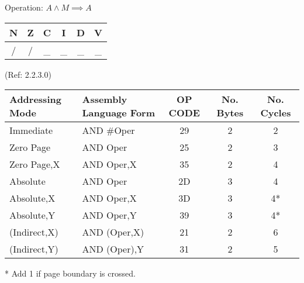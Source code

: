 \documentclass{article}
\begin{document}
  Operation:  
  $A \land M \implies A$
  \begin{table}[H]
  \centering
  \begin{tabular}{|c c c c c c|}
  \hline
  N&Z&C&I&D&V\\
  \hline
  /&/&\_&\_&\_&\_\\
  \hline
  \end{tabular}
  \end{table}
                               (Ref: 2.2.3.0)
  \begin{table}[H]
  \centering
  \begin{tabular}{|l|l|c|c|c|}
  \hline
  Addressing Mode & Assembly Language Form & OP CODE & No. Bytes & No. Cycles\\
  \hline
  Immediate    &   AND \#Oper           &    29   &    2    &    2     \\
  Zero Page    &   AND Oper            &    25   &    2    &    3     \\
  Zero Page,X  &   AND Oper,X          &    35   &    2    &    4     \\
  Absolute     &   AND Oper            &    2D   &    3    &    4     \\
  Absolute,X   &   AND Oper,X          &    3D   &    3    &    4*    \\
  Absolute,Y   &   AND Oper,Y          &    39   &    3    &    4*    \\
  (Indirect,X) &   AND (Oper,X)        &    21   &    2    &    6     \\
  (Indirect,Y) &   AND (Oper),Y        &    31   &    2    &    5     \\
  \hline
  \end{tabular}
  \end{table}
  * Add 1 if page boundary is crossed.
\end{document}
